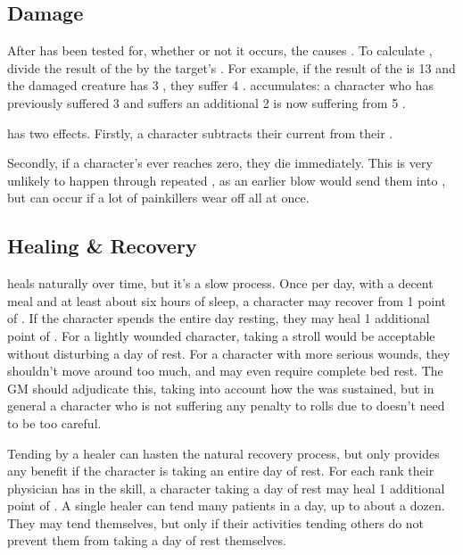 \subsection{Damage}

After {\shock} has been tested for, whether or not it occurs, the {\damagetest} causes {\damage}.
To calculate {\damage}, divide the result of the {\damagetest} by the target's .
For example, if the result of the {\damagetest} is 13 and the damaged creature has 3 , they suffer 4 {\damage}.
{\damage} accumulates: a character who has previously suffered 3 {\damage} and suffers an additional 2 is now suffering from 5 {\damage}.

{\damage} has two effects.
Firstly, a character subtracts their current {\damage} from their .

Secondly, if a character's  ever reaches zero, they die immediately.
This is very unlikely to happen through repeated {\damage}, as an earlier blow would send them into {\shock}, but can occur if a lot of painkillers wear off all at once.

\subsection{Healing \& Recovery}

{\damage} heals naturally over time, but it's a slow process.
Once per day, with a decent meal and at least about six hours of sleep, a character may recover from 1 point of {\damage}.
If the character spends the entire day resting, they may heal 1 additional point of {\damage}.
For a lightly wounded character, taking a stroll would be acceptable without disturbing a day of rest.
For a character with more serious wounds, they shouldn't move around too much, and may even require complete bed rest.
The GM should adjudicate this, taking into account how the {\damage} was sustained, but in general a character who is not suffering any penalty to rolls due to {\damage} doesn't need to be too careful.

Tending by a healer can hasten the natural recovery process, but only provides any benefit if the character is taking an entire day of rest.
For each rank their physician has in the  skill, a character taking a day of rest may heal 1 additional point of {\damage}.
A single healer can tend many patients in a day, up to about a dozen.
They may tend themselves, but only if their activities tending others do not prevent them from taking a day of rest themselves.

